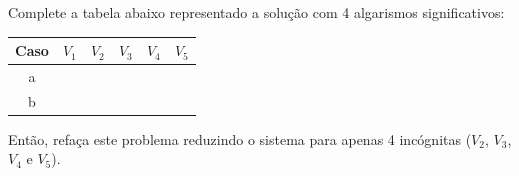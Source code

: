 \begin{Exercise}[title=Eletricidade]
Complete a tabela abaixo representado a solução com 4 algarismos significativos:

\begin{center}
\begin{tabular}{|c|c|c|c|c|c|}
\hline
Caso & $V_1$ & $V_2$ & $V_3$ & $V_4$ & $V_5$\\
\hline
a & ~\hspace{40pt}~& ~\hspace{40pt}~& ~\hspace{40pt}~& ~\hspace{40pt}~& ~\hspace{40pt}~\\
\hline
b & & & & & \\
\hline
\end{tabular}
\end{center}

Então, refaça este problema reduzindo o sistema para apenas 4 incógnitas ($V_2$, $V_3$, $V_4$ e $V_5$).
\end{Exercise}
\ifisscilab
